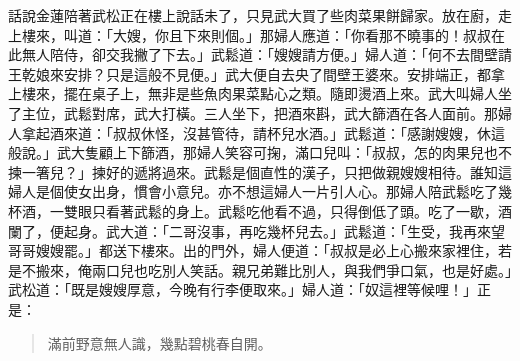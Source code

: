 話說金蓮陪著武松正在樓上說話未了，只見武大買了些肉菜果餅歸家。放在廚，走上樓來，叫道：「大嫂，你且下來則個。」那婦人應道：「你看那不曉事的！叔叔在此無人陪侍，卻交我撇了下去。」武鬆道：「嫂嫂請方便。」婦人道：「何不去間壁請王乾娘來安排？只是這般不見便。」武大便自去央了間壁王婆來。安排端正，都拿上樓來，擺在桌子上，無非是些魚肉果菜點心之類。隨即燙酒上來。武大叫婦人坐了主位，武鬆對席，武大打橫。三人坐下，把酒來斟，武大篩酒在各人面前。那婦人拿起酒來道：「叔叔休怪，沒甚管待，請杯兒水酒。」武鬆道：「感謝嫂嫂，休這般說。」武大隻顧上下篩酒，那婦人笑容可掬，滿口兒叫：「叔叔，怎的肉果兒也不揀一箸兒？」揀好的遞將過來。武鬆是個直性的漢子，只把做親嫂嫂相待。誰知這婦人是個使女出身，慣會小意兒。亦不想這婦人一片引人心。那婦人陪武鬆吃了幾杯酒，一雙眼只看著武鬆的身上。武鬆吃他看不過，只得倒低了頭。吃了一歇，酒闌了，便起身。武大道：「二哥沒事，再吃幾杯兒去。」武鬆道：「生受，我再來望哥哥嫂嫂罷。」都送下樓來。出的門外，婦人便道：「叔叔是必上心搬來家裡住，若是不搬來，俺兩口兒也吃別人笑話。親兄弟難比別人，與我們爭口氣，也是好處。」武松道：「既是嫂嫂厚意，今晚有行李便取來。」婦人道：「奴這裡等候哩！」正是：
\begin{quote}
滿前野意無人識，幾點碧桃春自開。
\end{quote}
